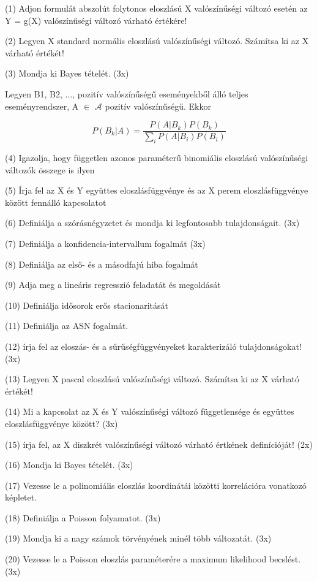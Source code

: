 \documentclass[12p]{article}
\begin{document}
(1) Adjon formulát abszolút folytonos eloszlású X valószínűségi változó esetén az Y = g(X) valószínűségi változó várható értékére!

(2) Legyen X standard normális eloszlású valószínűségi változó. Számítsa ki az X várható értékét! 

(3) Mondja ki Bayes tételét. (3x)

Legyen B1, B2, ..., pozitív valószínűségű eseményekből álló teljes eseményrendszer, A $\in$ $\mathscr{A}$ pozitív valószínűségű. Ekkor

$$\displaystyle{P(B_k|A) = \frac{P(A|B_k)P(B_k)}{\displaystyle{\sum_i} P(A|B_i)P(B_i)}}$$

(4) Igazolja, hogy független azonos paraméterű binomiális eloszlású valószínűségi változók összege is ilyen

(5) Írja fel az X és Y együttes eloszlásfüggvénye és az X perem eloszlásfüggvénye között fennálló kapcsolatot

(6)  Definiálja a szórásnégyzetet és mondja ki legfontosabb tulajdonságait. (3x)

(7) Definiálja a konfidencia-intervallum fogalmát (3x)

(8) Definiálja az első- és a másodfajú hiba fogalmát

(9) Adja meg a lineáris regresszió feladatát és megoldását

(10) Definiálja idősorok erős stacionaritását

(11) Definiálja az ASN fogalmát.

(12) írja fel az eloszás- és a sűrűségfüggvényeket karakterizáló tulajdonságokat! (3x)

(13) Legyen X pascal eloszlású valószínűségi változó. Számítsa ki az X várható értékét!

(14) Mi a kapcsolat az X és Y valószínűségi változó függetlensége és együttes eloszlásfüggvénye között? (3x)

(15) írja fel, az X diszkrét valószínűségi változó várható értkének definícióját! (2x)

(16) Mondja ki Bayes tételét. (3x)

(17) Vezesse le a polinomiális eloszlás koordinátái közötti korrelációra vonatkozó képletet.

(18) Definiálja a Poisson folyamatot. (3x)

(19) Mondja ki a nagy számok törvényének minél több változatát. (3x)

(20) Vezesse le a Poisson eloszlás paraméterére a maximum likelihood becslést. (3x)
\end{document}
